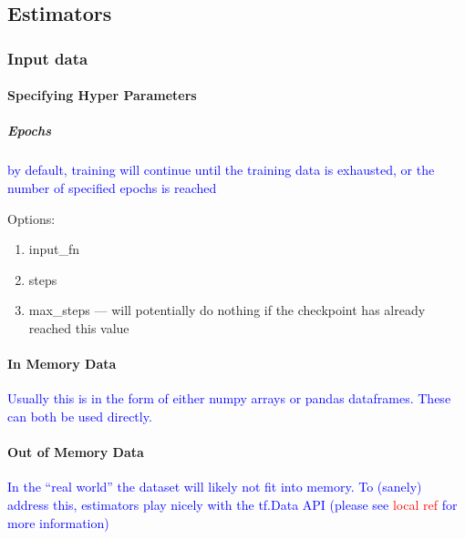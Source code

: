 \subsection{Estimators}



\subsubsection{Input data}


\paragraph{Specifying Hyper Parameters}

\subparagraph{Epochs}
\textcolor{blue}{by default, training will continue until the training data is exhausted, or the number of specified epochs is reached}

Options:

\begin{enumerate}
	\item input\_fn
	\item steps
	\item max\_steps --- will potentially do nothing if the checkpoint has already reached this value
\end{enumerate}


\paragraph{In Memory Data}

\textcolor{blue}{Usually this is in the form of either numpy arrays or pandas dataframes. These can both be used directly.}



\paragraph{Out of Memory Data}

\textcolor{blue}{In the ``real world'' the dataset will likely not fit into memory. To (sanely) address this, estimators play nicely with the tf.Data API (please see \textcolor{red}{local ref} for more information)}

